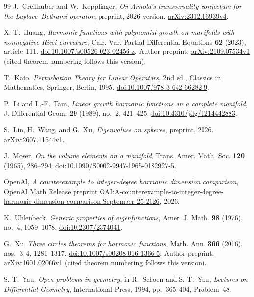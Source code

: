 \begin{thebibliography}{99}
J.~Greilhuber and W.~Kepplinger,
\emph{On Arnold's transversality conjecture for the Laplace--Beltrami operator},
preprint, 2026 version.
\href{https://arxiv.org/abs/2312.16939v4}{arXiv:2312.16939v4}.

X.-T.~Huang,
\emph{Harmonic functions with polynomial growth on manifolds with
nonnegative Ricci curvature},
Calc. Var. Partial Differential Equations \textbf{62} (2023), article~111.
\href{https://doi.org/10.1007/s00526-023-02456-z}{doi:10.1007/s00526-023-02456-z}.
Author preprint: \href{https://arxiv.org/abs/2109.07534v1}{arXiv:2109.07534v1}
(cited theorem numbering follows this version).

T.~Kato,
\emph{Perturbation Theory for Linear Operators},
2nd ed., Classics in Mathematics, Springer, Berlin, 1995.
\href{https://doi.org/10.1007/978-3-642-66282-9}{doi:10.1007/978-3-642-66282-9}.

P.~Li and L.-F.~Tam,
\emph{Linear growth harmonic functions on a complete manifold},
J. Differential Geom. \textbf{29} (1989), no.~2, 421--425.
\href{https://doi.org/10.4310/jdg/1214442883}{doi:10.4310/jdg/1214442883}.

S.~Lin, H.~Wang, and G.~Xu,
\emph{Eigenvalues on spheres},
preprint, 2026.
\href{https://arxiv.org/abs/2607.11544v1}{arXiv:2607.11544v1}.

J.~Moser,
\emph{On the volume elements on a manifold},
Trans. Amer. Math. Soc. \textbf{120} (1965), 286--294.
\href{https://doi.org/10.1090/S0002-9947-1965-0182927-5}{doi:10.1090/S0002-9947-1965-0182927-5}.

OpenAI,
\emph{A counterexample to integer-degree harmonic dimension comparison},
OpenAI Math Release preprint
\href{https://github.com/openai/math/blob/main/preprints/A-counterexample-to-integer-degree-harmonic-dimension-comparison-September-25-2026/paper.pdf}{OAI:A-counterexample-to-integer-degree-harmonic-dimension-comparison-September-25-2026},
2026.

K.~Uhlenbeck,
\emph{Generic properties of eigenfunctions},
Amer. J. Math. \textbf{98} (1976), no.~4, 1059--1078.
\href{https://doi.org/10.2307/2374041}{doi:10.2307/2374041}.

G.~Xu,
\emph{Three circles theorems for harmonic functions},
Math. Ann. \textbf{366} (2016), nos.~3--4, 1281--1317.
\href{https://doi.org/10.1007/s00208-016-1366-5}{doi:10.1007/s00208-016-1366-5}.
Author preprint: \href{https://arxiv.org/abs/1601.02066v1}{arXiv:1601.02066v1}
(cited theorem numbering follows this version).

S.-T.~Yau,
\emph{Open problems in geometry},
in R.~Schoen and S.-T.~Yau, \emph{Lectures on Differential Geometry},
International Press, 1994, pp.~365--404, Problem~48.

\end{thebibliography}
